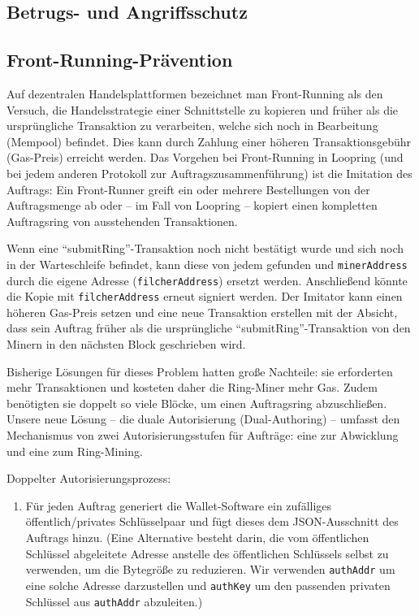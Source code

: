 \documentclass[UTF8,nofonts]{article}
\begin{document}
\begin{multicols}{2}
\section{Betrugs- und Angriffsschutz}

\subsection{Front-Running-Prävention\label{sec:dual_authoring}}

Auf dezentralen Handelsplattformen bezeichnet man Front-Running als den Versuch, die Handelsstrategie einer Schnittstelle zu kopieren und früher als die ursprüngliche Transaktion zu verarbeiten, welche sich noch in Bearbeitung (Mempool) befindet. Dies kann durch Zahlung einer höheren Transaktionsgebühr (Gas-Preis) erreicht werden. Das Vorgehen bei Front-Running in Loopring (und bei jedem anderen Protokoll zur Auftragszusammenführung) ist die Imitation des Auftrags: Ein Front-Runner greift ein oder mehrere Bestellungen von der Auftragsmenge ab oder – im Fall von Loopring – kopiert einen kompletten Auftragsring von ausstehenden Transaktionen.

Wenn eine \enquote{submitRing}-Transaktion noch nicht bestätigt wurde und sich noch in der Warteschleife befindet, kann diese von jedem gefunden und \verb|minerAddress| durch die eigene Adresse (\verb|filcherAddress|) ersetzt werden. Anschließend könnte die Kopie mit \verb|filcherAddress| erneut signiert werden. Der Imitator kann einen höheren Gas-Preis setzen und eine neue Transaktion erstellen mit der Absicht, dass sein Auftrag früher als die ursprüngliche \enquote{submitRing}-Transaktion von den Minern in den nächsten Block geschrieben wird.

Bisherige Lösungen für dieses Problem hatten große Nachteile: sie erforderten mehr Transaktionen und kosteten daher die Ring-Miner mehr Gas. Zudem benötigten sie doppelt so viele Blöcke, um einen Auftragsring abzuschließen. Unsere neue Lösung – die duale Autorisierung (Dual-Authoring) \cite{dualauthor} – umfasst den Mechanismus von zwei Autorisierungsstufen für Aufträge: eine zur Abwicklung und eine zum Ring-Mining.

Doppelter Autorisierungsprozess:

\begin{enumerate}

	\item Für jeden Auftrag generiert die Wallet-Software ein zufälliges öffentlich/privates Schlüsselpaar und fügt dieses dem JSON-Ausschnitt des Auftrags hinzu. (Eine Alternative besteht darin, die vom öffentlichen Schlüssel abgeleitete Adresse anstelle des öffentlichen Schlüssels selbst zu verwenden, um die Bytegröße zu reduzieren. Wir verwenden \verb|authAddr| um eine solche Adresse darzustellen und \verb|authKey| um den passenden privaten Schlüssel aus \verb|authAddr| abzuleiten.)


\end{enumerate}
\end{multicols}
\end{document}
